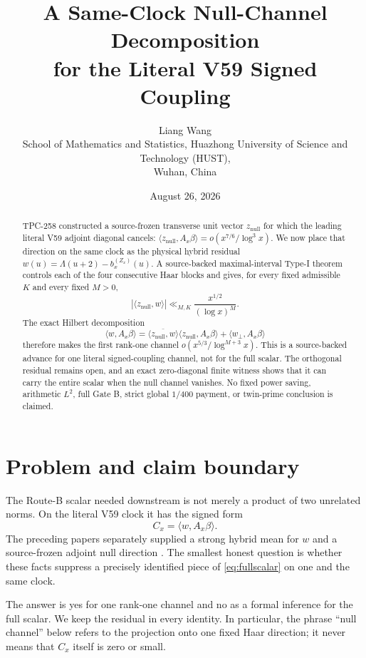 \documentclass[10pt]{article}
\title{A Same-Clock Null-Channel Decomposition\\
for the Literal V59 Signed Coupling}
\author{Liang Wang\\
\small School of Mathematics and Statistics, Huazhong University of Science and Technology (HUST),\\
\small Wuhan, China}
\date{August 26, 2026}
\newcommand{\ip}[2]{\langle #1,#2\rangle}
\newcommand{\Ax}{A_x}
\newcommand{\znull}{z_{\mathrm{null}}}
\newcommand{\wperp}{w_{\perp}}
\begin{document}
\maketitle

\begin{abstract}
TPC-258 constructed a source-frozen transverse unit vector
\(\znull\) for which the leading literal V59 adjoint diagonal cancels:
\(\ip{\znull}{A_x\beta}=o(x^{7/6}/\log^3x)\).  We now place that
direction on the same clock as the physical hybrid residual
\(w(u)=\Lambda(u+2)-b_x^{(Z_x)}(u)\).  A source-backed maximal-interval
Type-I theorem controls each of the four consecutive Haar blocks and gives,
for every fixed admissible \(K\) and every fixed \(M>0\),
\[
 |\ip{\znull}{w}|\ll_{M,K}\frac{x^{1/2}}{(\log x)^M}.
\]
The exact Hilbert decomposition
\[
 \ip{w}{A_x\beta}
 =\overline{\ip{\znull}{w}}\ip{\znull}{A_x\beta}
   +\ip{\wperp}{A_x\beta}
\]
therefore makes the first rank-one channel
\(o(x^{5/3}/\log^{M+3}x)\).  This is a source-backed advance for one
literal signed-coupling channel, not for the full scalar.  The orthogonal
residual remains open, and an exact zero-diagonal finite witness shows that
it can carry the entire scalar when the null channel vanishes.  No fixed
power saving, arithmetic \(L^2\), full Gate B, strict global \(1/400\)
payment, or twin-prime conclusion is claimed.
\end{abstract}

\section{Problem and claim boundary}

The Route-B scalar needed downstream is not merely a product of two unrelated
norms.  On the literal V59 clock it has the signed form
\begin{equation}
 C_x=\ip{w}{\Ax\beta}.                                      \label{eq:fullscalar}
\end{equation}
The preceding papers separately supplied a strong hybrid mean for \(w\)
and a source-frozen adjoint null direction \cite{tpc254,tpc258}.  The smallest
honest question is whether these facts suppress a precisely identified
piece of \eqref{eq:fullscalar} on one and the same clock.

The answer is yes for one rank-one channel and no as a formal inference for
the full scalar.  We keep the residual in every identity.  In particular,
the phrase ``null channel'' below refers to the projection onto one fixed
Haar direction; it never means that \(C_x\) itself is zero or small.
\end{document}
